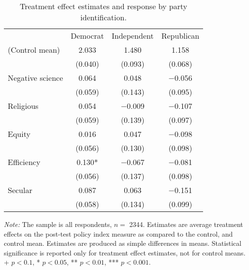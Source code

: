 \begin{table*}

\caption{\label{tab:unnamed-chunk-18}Treatment effect estimates and response by party identification.\label{tab:party_dim}}
\centering
\begin{threeparttable}
\begin{tabular}[t]{lccc}
\toprule
  & Democrat & Independent & Republican\\
\cmidrule(lr){2-2} \cmidrule(lr){3-3} \cmidrule(lr){4-4}
(Control mean) & \num{2.033} & \num{1.480} & \num{1.158}\\
 & (\num{0.040}) & (\num{0.093}) & (\num{0.068})\\
Negative science & \num{0.064} & \num{0.048} & \num{-0.056}\\
 & (\num{0.059}) & (\num{0.143}) & (\num{0.095})\\
Religious & \num{0.054} & \num{-0.009} & \num{-0.107}\\
 & (\num{0.059}) & (\num{0.139}) & (\num{0.097})\\
Equity & \num{0.016} & \num{0.047} & \num{-0.098}\\
 & (\num{0.056}) & (\num{0.130}) & (\num{0.098})\\
Efficiency & \num{0.130}* & \num{-0.067} & \num{-0.081}\\
 & (\num{0.056}) & (\num{0.137}) & (\num{0.098})\\
Secular & \num{0.087} & \num{0.063} & \num{-0.151}\\
 & (\num{0.058}) & (\num{0.134}) & (\num{0.099})\\
\bottomrule
\end{tabular}
\begin{tablenotes}
\item \footnotesize \textit{Note:} The sample is all respondents, $n = $ \num{2344}. Estimates are average treatment effects on the post-test policy index measure as compared to the control, and control mean. Estimates are produced as simple differences in means. Statistical significance is reported only for treatment effect estimates, not for control means. + $p < 0.1$, * $p < 0.05$, ** $p < 0.01$, *** $p < 0.001$.
\end{tablenotes}
\end{threeparttable}
\end{table*}
